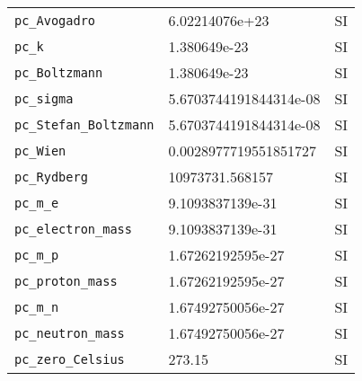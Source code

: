 \begin{tabular}{lll}
{\tt pc\_Avogadro} \index{pc\_Avogadro}  & 6.02214076e+23 & SI \\
{\tt pc\_k} \index{pc\_k}  & 1.380649e-23 & SI \\
{\tt pc\_Boltzmann} \index{pc\_Boltzmann}  & 1.380649e-23 & SI \\
{\tt pc\_sigma} \index{pc\_sigma}  & 5.6703744191844314e-08 & SI \\
{\tt pc\_Stefan\_Boltzmann} \index{pc\_Stefan\_Boltzmann}  & 5.6703744191844314e-08 & SI \\
{\tt pc\_Wien} \index{pc\_Wien}  & 0.0028977719551851727 & SI \\
{\tt pc\_Rydberg} \index{pc\_Rydberg}  & 10973731.568157 & SI \\
{\tt pc\_m\_e} \index{pc\_m\_e}  & 9.1093837139e-31 & SI \\
{\tt pc\_electron\_mass} \index{pc\_electron\_mass}  & 9.1093837139e-31 & SI \\
{\tt pc\_m\_p} \index{pc\_m\_p}  & 1.67262192595e-27 & SI \\
{\tt pc\_proton\_mass} \index{pc\_proton\_mass}  & 1.67262192595e-27 & SI \\
{\tt pc\_m\_n} \index{pc\_m\_n}  & 1.67492750056e-27 & SI \\
{\tt pc\_neutron\_mass} \index{pc\_neutron\_mass}  & 1.67492750056e-27 & SI \\
{\tt pc\_zero\_Celsius} \index{pc\_zero\_Celsius}  & 273.15 & SI \\
\end{tabular}

